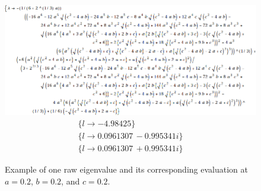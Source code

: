 \documentclass{article}
\begin{document}
\begin{figure}[h]
	\centering
	\includegraphics[scale=0.5]{messy_output}
	\begin{gather*}
		\{l\to -4.98425\}\\
		\{l\to 0.0961307\, -0.995341 i\}\\
		\{l\to 0.0961307\, +0.995341 i\}
	\end{gather*}
	\caption{Example of one raw eigenvalue and its corresponding evaluation at $a=0.2$, $b=0.2$, and $c=0.2$.}
	\label{fig:raw_ev}
\end{figure}
\end{document}
